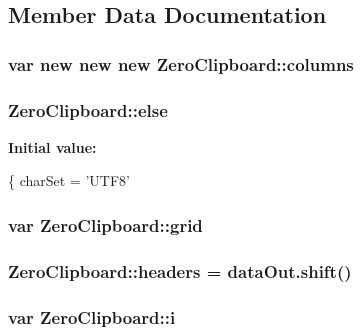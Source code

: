\subsection{Member Data Documentation}
\hypertarget{class_zero_clipboard_a350d8f226c904b59086f82f7106ab09a}{
\subsubsection[{columns}]{\setlength{\rightskip}{0pt plus 5cm}var new new new Zero\+Clipboard\+::columns}}\label{class_zero_clipboard_a350d8f226c904b59086f82f7106ab09a}
\hypertarget{class_zero_clipboard_a18ece373746e9446cf10bdcf1758648c}{
\subsubsection[{else}]{\setlength{\rightskip}{0pt plus 5cm}Zero\+Clipboard\+::else}}\label{class_zero_clipboard_a18ece373746e9446cf10bdcf1758648c}
{\bfseries Initial value\+:}
\begin{DoxyCode}
\{
                charSet = \textcolor{stringliteral}{'UTF8'}
\end{DoxyCode}
\hypertarget{class_zero_clipboard_a8a5fe1f6b72c77c227e3fae9547afcb2}{
\subsubsection[{grid}]{\setlength{\rightskip}{0pt plus 5cm}var Zero\+Clipboard\+::grid}}\label{class_zero_clipboard_a8a5fe1f6b72c77c227e3fae9547afcb2}
\hypertarget{class_zero_clipboard_a9ba182b97e1ab9180481caf9f24a63ac}{
\subsubsection[{headers}]{\setlength{\rightskip}{0pt plus 5cm}Zero\+Clipboard\+::headers = data\+Out.\+shift()}}\label{class_zero_clipboard_a9ba182b97e1ab9180481caf9f24a63ac}
\hypertarget{class_zero_clipboard_a6223f7d5fbe005d68fc2491950a20f87}{
\subsubsection[{i}]{\setlength{\rightskip}{0pt plus 5cm}var Zero\+Clipboard\+::i}}\label{class_zero_clipboard_a6223f7d5fbe005d68fc2491950a20f87}
